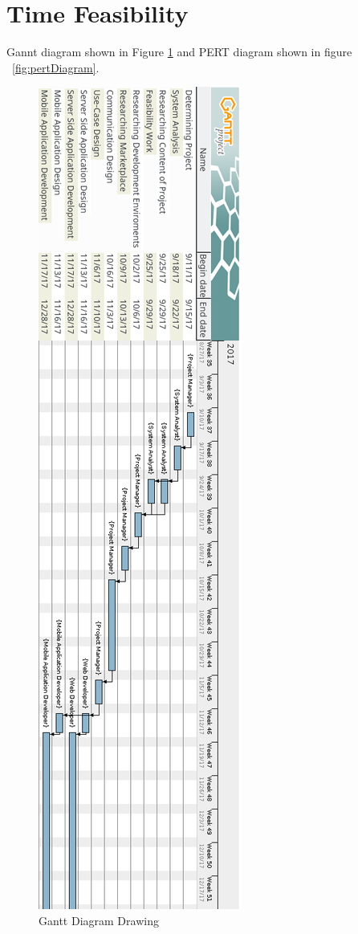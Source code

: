 \newpage
\section{Time Feasibility}
Gannt diagram shown in Figure \ref{fig:ganttDeneme} and PERT diagram shown in figure ~\ref{fig:pertDiagram}.
\begin{figure}[!htbp]
\centering
\includegraphics[scale= 0.64]{projectChapters/images/gant.png}
\caption{Gantt Diagram Drawing}
\label{fig:ganttDeneme}
\end{figure}

